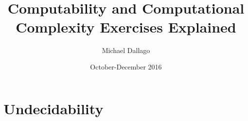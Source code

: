 \documentclass[titlepage]{article}
\title{Computability and Computational Complexity Exercises Explained}
\author{Michael Dallago}
\date{October-December 2016}
\begin{document}
\maketitle

\section{Undecidability}
\end{document}
